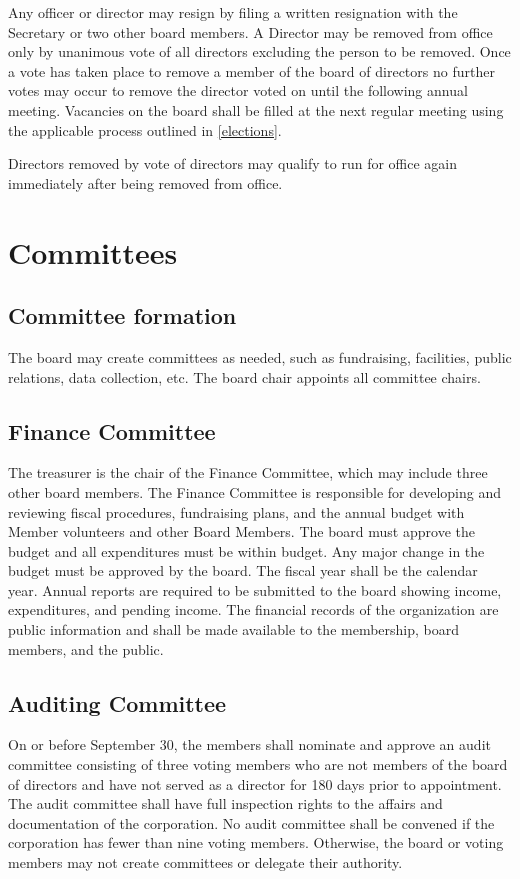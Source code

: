 \documentclass[10pt,letterpaper,titlepage]{article}
\begin{document}
Any officer or director may resign by filing a written resignation with the
Secretary or two other board members.
A Director may be removed from office only by unanimous vote of all directors
excluding the person to be removed.
Once a vote has taken place to remove a member of the board of directors no
further votes may occur to remove the director voted on until the following
annual meeting.
Vacancies on the board shall be filled at the next regular meeting using the
applicable process outlined in \ref{elections}.

Directors removed by vote of directors may qualify to run for office again
immediately after being removed from office.

\section{Committees}

\subsection{Committee formation}

The board may create committees as needed, such as fundraising, facilities,
public relations, data collection, etc.
The board chair appoints all committee chairs.

\subsection{Finance Committee}

The treasurer is the chair of the Finance Committee, which may include three
other board members.
The Finance Committee is responsible for developing and reviewing fiscal
procedures, fundraising plans, and the annual budget with Member volunteers and
other Board Members.
The board must approve the budget and all expenditures must be within budget.
Any major change in the budget must be approved by the board.
The fiscal year shall be the calendar year.
Annual reports are required to be submitted to the board showing income,
expenditures, and pending income.
The financial records of the organization are public information and shall be
made available to the membership, board members, and the public.

\subsection{Auditing Committee}

On or before September 30, the members shall nominate and approve an audit
committee consisting of three voting members who are not members of the board
of directors and have not served as a director for 180 days prior to
appointment.
The audit committee shall have full inspection rights to the affairs and
documentation of the corporation.
No audit committee shall be convened if the corporation has fewer than nine
voting members.
Otherwise, the board or voting members may not create committees or delegate
their authority. 
\end{document}
